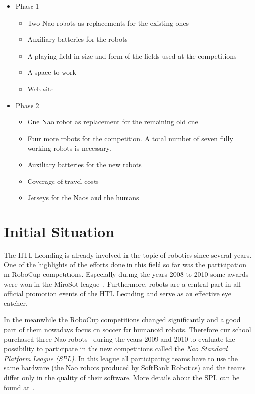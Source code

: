 \documentclass[12pt]{article}
\theoremstyle{definition}
\begin{document}
\begin{itemize}
	\item Phase 1
    	\begin{itemize}
            	\item Two Nao robots as replacements for the existing ones
		\item Auxiliary batteries for the robots
            	\item A playing field in size and form of the fields used at the competitions
		\item A space to work
            	\item Web site
    	\end{itemize}
	\item Phase 2
	\begin{itemize}
		\item One Nao robot as replacement for the remaining old one
            	\item Four more robots for the competition. A total number of seven fully working robots is necessary.
            	\item Auxiliary batteries for the new robots
            	\item Coverage of travel costs
		\item Jerseys for the Naos and the humans
	\end{itemize}
\end{itemize}

\section{Initial Situation}
The HTL Leonding is already involved in the topic of robotics since several years. One of the highlights of the efforts done in this field so far was the participation in RoboCup competitions. Especially during the years 2008 to 2010 some awards were won in the MiroSot league~\cite{fira_micro_2014}. Furthermore, robots are a central part in all official promotion events of the HTL Leonding and serve as an effective eye catcher.

In the meanwhile the RoboCup competitions changed significantly and a good part of them nowadays focus on soccer for humanoid robots. Therefore our school purchased three Nao robots~\cite{softbank_robotics_who_2016} during the years 2009 and 2010 to evaluate the possibility to participate in the new competitions called the {\em Nao Standard Platform League (SPL)}. In this league all participating teams have to use the same hardware (the Nao robots produced by SoftBank Robotics) and the teams differ only in the quality of their software. More details about the SPL can be found at~\cite{spl_standard_2016}.
\end{document}
